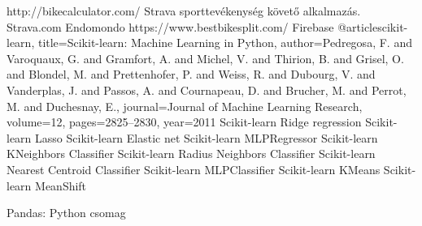 \begin{thebibliography}{x}

 http://bikecalculator.com/
 Strava sporttevékenység követő alkalmazás. Strava.com 
 Endomondo
	https://www.bestbikesplit.com/
 Firebase
@article{scikit-learn,
	title={Scikit-learn: Machine Learning in {P}ython},
	author={Pedregosa, F. and Varoquaux, G. and Gramfort, A. and Michel, V.
		and Thirion, B. and Grisel, O. and Blondel, M. and Prettenhofer, P.
		and Weiss, R. and Dubourg, V. and Vanderplas, J. and Passos, A. and
		Cournapeau, D. and Brucher, M. and Perrot, M. and Duchesnay, E.},
	journal={Journal of Machine Learning Research},
	volume={12},
	pages={2825--2830},
	year={2011}
}
 Scikit-learn Ridge regression
 Scikit-learn Lasso
	Scikit-learn Elastic net
 Scikit-learn MLPRegressor
 Scikit-learn KNeighbors Classifier
 Scikit-learn Radius Neighbors Classifier
 Scikit-learn Nearest Centroid Classifier
 Scikit-learn MLPClassifier
 Scikit-learn KMeans
 Scikit-learn MeanShift
	
 Pandas: Python csomag

\iffalse
\bibitem{citekey} forrás megjelölés
\bibitem{Hohmeyer} M. E. Hohmeyer, B. A. Barsky: Rational continuity: parametric, geometric and Frenet frame
continuity of rational curves, {\em ACM Transactions on Graphics}, \textbf{8} (1989), 335--359.
\bibitem{TeX_Catalogue} \TeX\ Catalogue, {\ttfamily www.ctan.org/tex-archive/help/Catalogue/catalogue.html} 
\fi
\end{thebibliography}